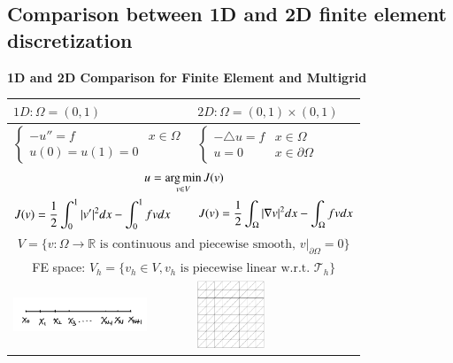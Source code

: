 \clearpage
\subsection{Comparison between 1D and 2D finite element discretization}
\begin{table}[]
\centerline{\bf 1D and 2D Comparison for Finite Element and Multigrid }\medskip
\centering
\begin{tabular}{ p{7cm}<{\centering}|p{7cm}<{\centering}}
\hline
   $1D: \Omega=(0, 1)$      \smallskip &    $2D: \Omega=(0, 1)\times (0, 1)$     
  \\\hline
 $\begin{cases}
 -u''=f&x\in \Omega\\
 u(0)=u(1)=0&
 \end{cases}$        &     
 $\begin{cases}
 -\triangle u=f&x\in \Omega\\
 u=0&x\in \partial \Omega
 \end{cases}$       
 \\\hline
  \multicolumn{2}{c}{$\displaystyle u=\operatorname*{arg\,min}_{v\in V}   J(v)$}   
 \\\hline
  $\displaystyle J(v)={1\over 2}\int_0^1  |v'|^2dx - \int_0^1  fv dx $
  &     $\displaystyle J(v)={1\over 2}\int_\Omega  |\nabla v|^2dx - \int_\Omega fv
  dx $      
 \\\hline
 \multicolumn{2}{c}{$V=\{v: \Omega\rightarrow \mathbb{R} \mbox{ is continuous and piecewise smooth, } v|_{\partial \Omega}=0\}$}
 \\\hline 
  \multicolumn{2}{c}{FE space: $V_h=\{v_h\in V, v_h \mbox{ is piecewise linear w.r.t. } \mathcal{T}_h\}$}  
\\\hline
\begin{minipage}{0.5\textwidth}\centering
      	\includegraphics[width=4cm]{figures/grid1d.png}
   	 \end{minipage}  
    	&  
	\begin{minipage}{0.2\textwidth}\centering
      	\includegraphics[width=2cm]{figures/grid1.png}
   	 \end{minipage} 

\end{tabular}
\end{table}
